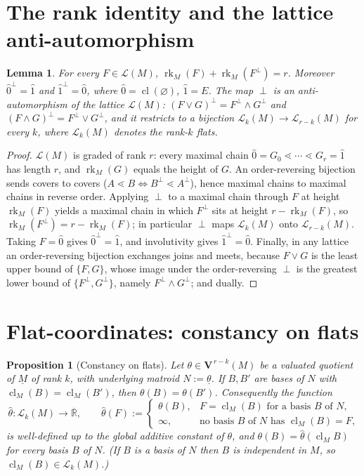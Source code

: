 \documentclass{article}
\newtheorem{proposition}[theorem]{Proposition}
\newtheorem{lemma}[theorem]{Lemma}
\theoremstyle{definition}
\newcommand{\Rbar}{\overline{\mathbb{R}}}
\newcommand{\rk}{\operatorname{rk}}
\newcommand{\cl}{\operatorname{cl}}
\newcommand{\bV}{\mathbf V}
\newcommand{\cLL}{\mathcal{L}}
\begin{document}
\section{The rank identity and the lattice anti-automorphism}

\begin{lemma}\label{lem:rank}
For every $F\in\cLL(M)$, $\rk_M(F)+\rk_M(F^{\perp})=r$. Moreover $\hat0^{\perp}=\hat1$ and
$\hat1^{\perp}=\hat0$, where $\hat0=\cl(\varnothing)$, $\hat1=E$. The map $\perp$ is an
anti-automorphism of the lattice $\cLL(M)$: $(F\vee G)^{\perp}=F^{\perp}\wedge G^{\perp}$ and
$(F\wedge G)^{\perp}=F^{\perp}\vee G^{\perp}$, and it restricts to a bijection
$\cLL_k(M)\to\cLL_{r-k}(M)$ for every $k$, where $\cLL_k(M)$ denotes the rank-$k$ flats.
\end{lemma}

\begin{proof}
$\cLL(M)$ is graded of rank $r$: every maximal chain $\hat0=G_0\lessdot\cdots\lessdot G_r=\hat1$ has
length $r$, and $\rk_M(G)$ equals the height of $G$. An order-reversing bijection sends covers to
covers ($A\lessdot B\iff B^{\perp}\lessdot A^{\perp}$), hence maximal chains to maximal chains in
reverse order. Applying $\perp$ to a maximal chain through $F$ at height $\rk_M(F)$ yields a maximal
chain in which $F^{\perp}$ sits at height $r-\rk_M(F)$, so $\rk_M(F^{\perp})=r-\rk_M(F)$; in
particular $\perp$ maps $\cLL_k(M)$ onto $\cLL_{r-k}(M)$. Taking $F=\hat0$ gives $\hat0^{\perp}=\hat1$,
and involutivity gives $\hat1^{\perp}=\hat0$. Finally, in any lattice an order-reversing bijection
exchanges joins and meets, because $F\vee G$ is the least upper bound of $\{F,G\}$, whose image under
the order-reversing $\perp$ is the greatest lower bound of $\{F^{\perp},G^{\perp}\}$, namely
$F^{\perp}\wedge G^{\perp}$; and dually.
\end{proof}

\section{Flat-coordinates: constancy on flats}

\begin{proposition}[Constancy on flats]\label{prop:constancy}
Let $\theta\in\bV^{\,r-k}(M)$ be a valuated quotient of $\underline M$ of rank $k$, with underlying
matroid $N:=\underline\theta$. If $B,B'$ are bases of $N$ with $\cl_M(B)=\cl_M(B')$, then
$\theta(B)=\theta(B')$. Consequently the function
\begin{equation}\label{eqn:hat-def}
  \widehat\theta\colon\cLL_k(M)\to\Rbar,\qquad
  \widehat\theta(F):=\begin{cases}\theta(B), & \text{$F=\cl_M(B)$ for a basis $B$ of $N$},\\
  \infty, & \text{no basis $B$ of $N$ has $\cl_M(B)=F$,}\end{cases}
\end{equation}
is well-defined up to the global additive constant of $\theta$, and $\theta(B)=\widehat\theta(\cl_M
B)$ for every basis $B$ of $N$. (If $B$ is a basis of $N$ then $B$ is independent in $M$, so
$\cl_M(B)\in\cLL_k(M)$.)
\end{proposition}
\end{document}
